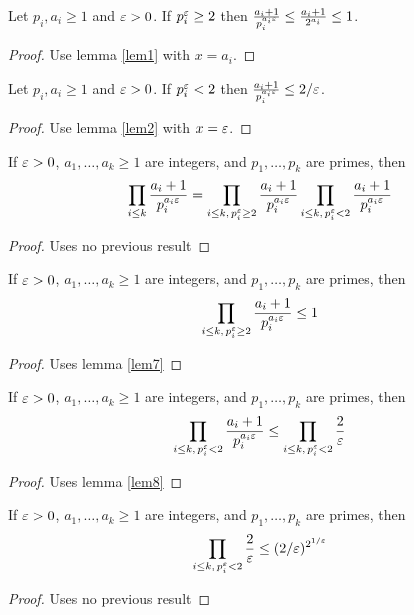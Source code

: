 \begin{lemma} \label{lem7} 
Let $p_i,a_i\ge1$ and $\varepsilon>0$. If $p_i^{\varepsilon}\ge 2$ then $\frac{a_i+1}{p_i^{a_i \varepsilon}}\le \frac{a_i+1}{2^{a_i}}\le 1$.
\end{lemma}
\begin{proof}\leanok
{}
Use lemma \ref{lem1} with $x=a_i$.
\end{proof}

\begin{lemma} \label{lem8} 
Let $p_i,a_i\ge1$ and $\varepsilon>0$. If $p_i^{\varepsilon}< 2$ then $\frac{a_i+1}{p_i^{a_i \varepsilon}}\le 2/\varepsilon$.
\end{lemma}
\begin{proof}\leanok
{}
Use lemma \ref{lem2} with $x=\varepsilon$.
\end{proof}

\begin{lemma} \label{lem9} 
If $\varepsilon>0$, $a_1,\ldots,a_k\ge1$ are integers, and $p_1,\ldots, p_k$ are primes, then 
\[
\prod_{i\le k}\frac{a_i+1}{p_i^{a_i \varepsilon}} = \prod_{i\le k, \, p_i^{\varepsilon}\ge 2}\frac{a_i+1}{p_i^{a_i \varepsilon}}\prod_{i\le k, \, p_i^{\varepsilon}< 2}\frac{a_i+1}{p_i^{a_i \varepsilon}}
\]
\end{lemma}
\begin{proof}\leanok
\uses{}
Uses no previous result
\end{proof}

\begin{lemma} \label{lem10} 
If $\varepsilon>0$, $a_1,\ldots,a_k\ge1$ are integers, and $p_1,\ldots, p_k$ are primes, then 
\[
\prod_{i\le k, \, p_i^{\varepsilon}\ge 2}\frac{a_i+1}{p_i^{a_i \varepsilon}} \le 1
\]
\end{lemma}
\begin{proof}\leanok
{}
Uses lemma \ref{lem7}
\end{proof}

\begin{lemma} \label{lem11} 
If $\varepsilon>0$, $a_1,\ldots,a_k\ge1$ are integers, and $p_1,\ldots, p_k$ are primes, then 
\[
\prod_{i\le k, \, p_i^{\varepsilon}< 2}\frac{a_i+1}{p_i^{a_i \varepsilon}} \le \prod_{i\le k, \, p_i^{\varepsilon}< 2}\frac{2}{\varepsilon}
\]
\end{lemma}
\begin{proof}\leanok
{}
Uses lemma \ref{lem8}
\end{proof}


\begin{lemma} \label{lem12} 
If $\varepsilon>0$, $a_1,\ldots,a_k\ge1$ are integers, and $p_1,\ldots, p_k$ are primes, then 
\[
\prod_{i\le k, \, p_i^{\varepsilon}< 2}\frac{2}{\varepsilon} \le (2/\varepsilon)^{2^{1/\varepsilon}}
\]
\end{lemma}
\begin{proof}\leanok
\uses{}
Uses no previous result
\end{proof}


